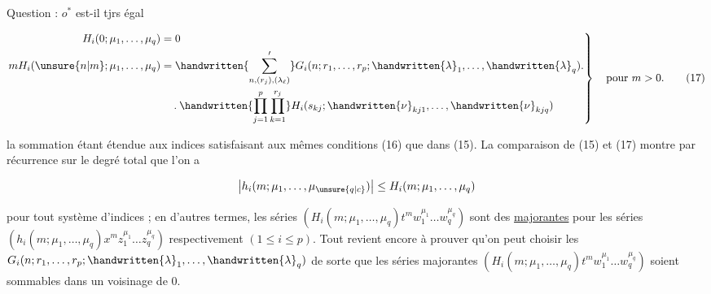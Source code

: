 






Question : $o^*$ est-il tjrs égal


\[
\left.\begin{aligned}
H_i(0;\mu_1,\ldots,\mu_q)&=0\\
mH_i(\unsure{n|m};\mu_1,\ldots,\mu_q)&=\handwritten{\sum'_{n,(r_j),(\lambda_\ell)}}G_i(n;r_1,\ldots,r_p;\handwritten{\lambda}_1,\ldots,\handwritten{\lambda}_q)\mathbin{.}\\
&\quad\mathbin{.}\handwritten{\prod_{j=1}^{p}\prod_{k=1}^{r_j}}H_i(s_{kj};\handwritten{\nu}_{kj1},\ldots,\handwritten{\nu}_{kjq})
\end{aligned}\right\}
\quad\text{pour }m>0.\tag*{(17)}
\]

la sommation étant étendue aux indices satisfaisant aux mêmes conditions (16) que dans (15). La comparaison de (15) et (17) montre par récurrence sur le degré total que l'on a

\[
\left|h_i(m;\mu_1,\ldots,\mu_{\unsure{q|c}})\right|\leq H_i(m;\mu_1,\ldots,\mu_q)
\]

pour tout système d'indices ; en d'autres termes, les séries $(H_i(m;\mu_1,\ldots,\mu_q)t^mw_1^{\mu_1}\ldots w_q^{\mu_q})$ sont des \uline{majorantes} pour les séries $(h_i(m;\mu_1,\ldots,\mu_q)x^mz_1^{\mu_1}\ldots z_q^{\mu_q})$ respectivement $(1\leq i\leq p)$. Tout revient encore à prouver qu'on peut choisir les $G_i(n;r_1,\ldots,r_p;\handwritten{\lambda}_1,\ldots,\handwritten{\lambda}_q)$ de sorte que les séries majorantes $(H_i(m;\mu_1,\ldots,\mu_q)t^mw_1^{\mu_1}\ldots w_q^{\mu_q})$ soient sommables dans un voisinage de $0$.


